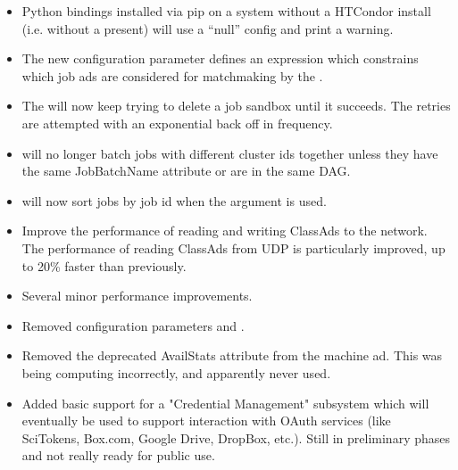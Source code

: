 \begin{itemize}
\item Python bindings installed via pip on a system without a
HTCondor install (i.e. without a  present)
will use a ``null'' config and print a warning.

\item The new configuration parameter 
defines an expression which constrains which job ads are considered for
matchmaking by the .

\item The  will now keep trying to delete a job sandbox until it succeeds.
The retries are attempted with an exponential back off in frequency.

\item {} will no longer batch jobs with different cluster ids together unless they
have the same JobBatchName attribute or are in the same DAG.

\item {} will now sort jobs by job id when the  argument is used.

\item Improve the performance of reading and writing ClassAds to the network.
The performance of reading ClassAds from UDP is particularly improved, up
to 20\% faster than previously.

\item Several minor performance improvements.

\item Removed configuration parameters 
and .

\item Removed the deprecated AvailStats attribute from the machine ad. This
was being computing incorrectly, and apparently never used.

\item Added basic support for a "Credential Management" subsystem which will
eventually be used to support interaction with OAuth services (like SciTokens,
Box.com, Google Drive, DropBox, etc.).  Still in preliminary phases and not
really ready for public use.

\end{itemize}

